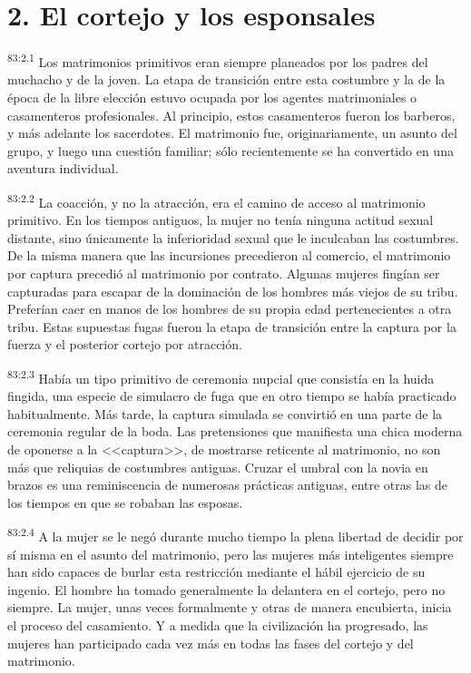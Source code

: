 \documentclass[twoside, 11pt]{book}
\begin{document}
\section*{2. El cortejo y los esponsales}
\par
\textsuperscript{83:2.1} Los matrimonios primitivos eran siempre planeados por los padres del muchacho y de la joven. La etapa de transición entre esta costumbre y la de la época de la libre elección estuvo ocupada por los agentes matrimoniales o casamenteros profesionales. Al principio, estos casamenteros fueron los barberos, y más adelante los sacerdotes. El matrimonio fue, originariamente, un asunto del grupo, y luego una cuestión familiar; sólo recientemente se ha convertido en una aventura individual.

\par
\textsuperscript{83:2.2} La coacción, y no la atracción, era el camino de acceso al matrimonio primitivo. En los tiempos antiguos, la mujer no tenía ninguna actitud sexual distante, sino únicamente la inferioridad sexual que le inculcaban las costumbres. De la misma manera que las incursiones precedieron al comercio, el matrimonio por captura precedió al matrimonio por contrato. Algunas mujeres fingían ser capturadas para escapar de la dominación de los hombres más viejos de su tribu. Preferían caer en manos de los hombres de su propia edad pertenecientes a otra tribu. Estas supuestas fugas fueron la etapa de transición entre la captura por la fuerza y el posterior cortejo por atracción.

\par
\textsuperscript{83:2.3} Había un tipo primitivo de ceremonia nupcial que consistía en la huida fingida, una especie de simulacro de fuga que en otro tiempo se había practicado habitualmente. Más tarde, la captura simulada se convirtió en una parte de la ceremonia regular de la boda. Las pretensiones que manifiesta una chica moderna de oponerse a la <<captura>>, de mostrarse reticente al matrimonio, no son más que reliquias de costumbres antiguas. Cruzar el umbral con la novia en brazos es una reminiscencia de numerosas prácticas antiguas, entre otras las de los tiempos en que se robaban las esposas.

\par
\textsuperscript{83:2.4} A la mujer se le negó durante mucho tiempo la plena libertad de decidir por sí misma en el asunto del matrimonio, pero las mujeres más inteligentes siempre han sido capaces de burlar esta restricción mediante el hábil ejercicio de su ingenio. El hombre ha tomado generalmente la delantera en el cortejo, pero no siempre. La mujer, unas veces formalmente y otras de manera encubierta, inicia el proceso del casamiento. Y a medida que la civilización ha progresado, las mujeres han participado cada vez más en todas las fases del cortejo y del matrimonio.
\end{document}
